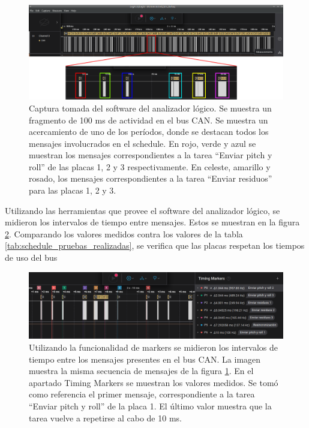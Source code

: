 \begin{figure}[H]
    \centering
    \includegraphics[width=\textwidth]{img/resultados_timing_sin_fallas_zoom.png}
    \caption{Captura tomada del software del analizador lógico. Se muestra un fragmento de 100 ms de actividad en el bus CAN. Se muestra un acercamiento de uno de los períodos, donde se destacan todos los mensajes involucrados en el schedule. En rojo, verde y azul se muestran los mensajes correspondientes a la tarea ``Enviar pitch y roll'' de las placas 1, 2 y 3 respectivamente. En celeste, amarillo y rosado, los mensajes correspondientes a la tarea ``Enviar residuos'' para las placas 1, 2 y 3.}
    \label{fig:resultados_timing_sin_fallas}
\end{figure}

Utilizando las herramientas que provee el software del analizador lógico, se midieron los intervalos de tiempo entre mensajes. Estos se muestran en la figura \ref{fig:resultados_timing_detalle_sin_fallas}. Comparando los valores medidos contra los valores de la tabla \ref{tab:schedule_pruebas_realizadas}, se verifica que las placas respetan los tiempos de uso del bus

\begin{figure}[H]
    \centering
    \includegraphics[width=\textwidth]{img/resultados_timing_detalle_sin_fallas.png}
    \caption{Utilizando la funcionalidad de markers se midieron los intervalos de tiempo entre los mensajes presentes en el bus CAN. La imagen muestra la misma secuencia de mensajes de la figura \ref{fig:resultados_timing_sin_fallas}. En el apartado Timing Markers se muestran los valores medidos. Se tomó como referencia el primer mensaje, correspondiente a la tarea ``Enviar pitch y roll'' de la placa 1. El último valor muestra que la tarea vuelve a repetirse al cabo de 10 ms.}
    \label{fig:resultados_timing_detalle_sin_fallas}
\end{figure}

